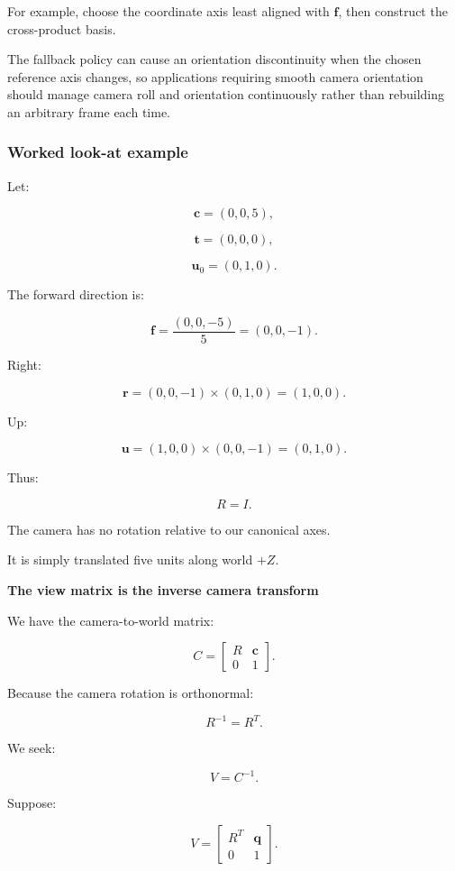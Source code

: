 For example, choose the coordinate axis least aligned with \(\mathbf f\), then construct the cross-product basis.

The fallback policy can cause an orientation discontinuity when the chosen reference axis changes, so applications requiring smooth camera orientation should manage camera roll and orientation continuously rather than rebuilding an arbitrary frame each time.

\subsubsection{Worked look-at example}\label{worked-look-at-example}

Let:

\[
 \mathbf c=(0,0,5),
\]

\[
 \mathbf t=(0,0,0),
\]

\[
 \mathbf u_0=(0,1,0).
\]

The forward direction is:

\[
 \mathbf f= \frac{(0,0,-5)}5 = (0,0,-1).
\]

Right:

\[
 \mathbf r=(0,0,-1)\times(0,1,0) =(1,0,0).
\]

Up:

\[
 \mathbf u=(1,0,0)\times(0,0,-1) =(0,1,0).
\]

Thus:

\[
 R=I.
\]

The camera has no rotation relative to our canonical axes.

It is simply translated five units along world \(+Z\).

\textbf{The view matrix is the inverse camera transform}

We have the camera-to-world matrix:

\[
 C= \begin{bmatrix} R&\mathbf c\\ 0&1 \end{bmatrix}.
\]

Because the camera rotation is orthonormal:

\[
 R^{-1}=R^T.
\]

We seek:

\[
 V=C^{-1}.
\]

Suppose:

\[
 V= \begin{bmatrix} R^T&\mathbf q\\ 0&1 \end{bmatrix}.
\]

